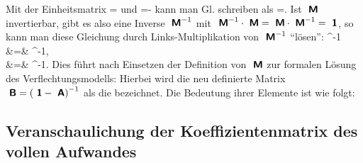 Mit der Einheitsmatrix 
\bdm
{}=
 \edm
und
\bdm
{}=-
\edm
kann man Gl.  schreiben als
\bdm
{}\cdot {}=.
\edm
Ist ${\mbox{ \sf\textbf{M}}}$ invertierbar, gibt es also eine Inverse ${\mbox{ \sf\textbf{M}}}^{-1}$
mit ${\mbox{ \sf\textbf{M}}}^{-1}\cdot {\mbox{ \sf\textbf{M}}}={\mbox{ \sf\textbf{M}}}\cdot {\mbox{ \sf\textbf{M}}}^{-1}={\mbox{ \sf\textbf{1}}}$, so
kann man diese Gleichung durch Links-Multiplikation von ${\mbox{ \sf\textbf{M}}}^{-1}$
``l\"osen'':
\bdma
{}^{-1}\cdot {}\cdot {} &=& ^{-1}\cdot {},\\
  &=& ^{-1}\cdot {}.
\edma
Dies f\"uhrt nach Einsetzen der Definition von ${\mbox{ \sf\textbf{M}}}$ zur formalen
L\"osung des Verflechtungsmodells:
Hierbei wird die neu definierte Matrix
${\mbox{ \sf\textbf{B}}}=\left({\mbox{ \sf\textbf{1}}}-{\mbox{ \sf\textbf{A}}}\right)^{-1}$ als die
 bezeichnet. Die
Bedeutung ihrer Elemente ist wie folgt:


\subsection{Veranschaulichung der Koeffizientenmatrix des vollen Aufwandes}

